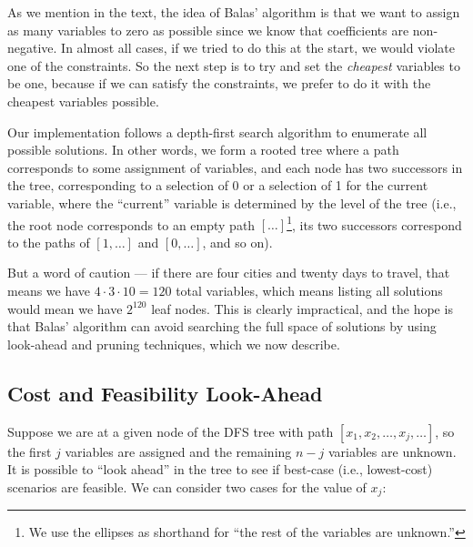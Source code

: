 \documentclass{article}
\begin{document}
As we mention in the text, the idea of Balas' algorithm is that we want to assign as many variables to zero as possible since we know that
coefficients are non-negative. In almost all cases, if we tried to do this at the start, we would violate one of the constraints. So the next step is
to try and set the \emph{cheapest} variables to be one, because if we can satisfy the constraints, we prefer to do it with the cheapest variables
possible.

Our implementation follows a depth-first search algorithm to enumerate all possible solutions. In other words, we form a rooted tree where a path
corresponds to some assignment of variables, and each node has two successors in the tree, corresponding to a selection of 0 or a selection of 1 for
the current variable, where the ``current'' variable is determined by the level of the tree (i.e., the root node corresponds to an empty path
$[\ldots]$\footnote{We use the ellipses as shorthand for ``the rest of the variables are unknown.''}, its two successors correspond to the paths of
$[1, \ldots]$ and $[0, \ldots]$, and so on).

But a word of caution --- if there are four cities and twenty days to travel, that means we have $4 \cdot 3 \cdot 10 = 120$ total variables, which
means listing all solutions would mean we have $2^{120}$ leaf nodes. This is clearly impractical, and the hope is that Balas' algorithm can avoid
searching the full space of solutions by using look-ahead and pruning techniques, which we now describe.

\subsection{Cost and Feasibility Look-Ahead}\label{app:balas_lookahead}

Suppose we are at a given node of the DFS tree with path $[x_1, x_2, \ldots, x_j, \ldots]$, so the first $j$ variables are assigned and the remaining
$n-j$ variables are unknown. It is possible to ``look ahead'' in the tree to see if best-case (i.e., lowest-cost) scenarios are feasible. We can
consider two cases for the value of $x_j$:
\end{document}
